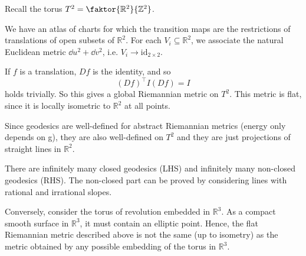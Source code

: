 \documentclass[a4paper]{article}
\begin{document}
\begin{example}
	Recall the torus \( T^2 = \faktor{\mathbb R^2}{\mathbb Z^2} \).

	We have an atlas of charts for which the transition maps are the restrictions of translations of open subsets of \( \mathbb R^2 \).
	For each \( V_i \subseteq \mathbb R^2 \), we associate the natural Euclidean metric \( \dd{u}^2 + \dd{v}^2 \), i.e. $ V_i\to \mathrm{id}_{2\times 2} $. 

	If \( f \) is a translation, \( Df \) is the identity, and so
	\[
		(Df)^\top I (Df) = I
	\]
	holds trivially.
	So this gives a global Riemannian metric on \( T^2 \).
	This metric is flat, since it is locally isometric to \( \mathbb R^2 \) at all points.

	Since geodesics are well-defined for abstract Riemannian metrics (energy only depends on g), they are also well-defined on $T^2$ and they are just projections of straight lines in $ \mathbb{R}^{2} $. 
	\begin{center}
	\end{center}
	There are infinitely many closed geodesics (LHS) and infinitely many non-closed geodesics (RHS). The non-closed part can be proved by considering lines with rational and irrational slopes.

	Conversely, consider the torus of revolution embedded in \( \mathbb R^3 \).
	As a compact smooth surface in \( \mathbb R^3 \), it must contain an elliptic point.
	Hence, the flat Riemannian metric described above is not the same (up to isometry) as the metric obtained by any possible embedding of the torus in \( \mathbb R^3 \).
\end{example}
\end{document}
